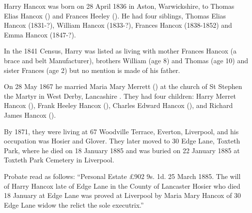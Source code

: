 
Harry Hancox was born on 28 April 1836 in Aston, Warwickshire, to Thomas Elias Hancox () and Frances Heeley ().  He had four siblings, Thomas Elias Hancox (1831-?), William Hancox (1833-?), Frances Hancox (1838-1852) and Emma Hancox (1847-?). 

In the 1841 Census, Harry was listed as living with mother Frances Hancox (a brace and belt Manufacturer), brothers William (age 8) and Thomas (age 10) and sister Frances (age 2) but no mention is made of his father. \cite{HarryHancoxBirth}

On 28 May 1867 he married Maria Mary Merrett () at the church of St Stephen the Martyr in West Derby, Lancashire \cite{HarryHancoxMarriage}.  They had four children: Harry Merret Hancox (), Frank Heeley Hancox (), Charles Edward Hancox (), and Richard James Hancox ().

By 1871, they were living at 67 Woodville Terrace, Everton, Liverpool, and his occupation was Hosier and Glover.\cite{HarryHancoxOccupation}  They later moved to 30 Edge Lane, Toxteth Park, where he died on 18 January 1885 \cite{HarryHancoxDeath} and was buried on 22 January 1885 at Toxteth Park Cemetery in Liverpool.\cite{HHGravestone}

Probate read as follows: ``Personal Estate \pounds 902 9s. 1d. 25 March 1885. The will of Harry Hancox late of Edge Lane in the County of Lancaster Hosier who died 18 January at Edge Lane was proved at Liverpool by Maria Mary Hancox of 30 Edge Lane widow the relict the sole executrix.''
